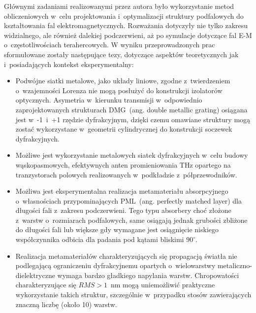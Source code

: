 Głównymi zadaniami realizowanymi przez autora było wykorzystanie metod obliczeniowych w~celu projektowania i~optymalizacji struktury podfalowych do kształtowania fal elektromagnetycznych. Rozważania dotyczyły nie tylko zakresu widzialnego, ale również dalekiej podczerwieni, aż po symulacje dotyczące fal E-M o~częstotliwościach terahercowych. W wyniku przeprowadzonych prac sformułowane zostały następujące tezy, dotyczące aspektów teoretycznych jak i~posiadających kontekst eksperymentalny:
\begin{itemize}
\item Podwójne siatki metalowe, jako układy liniowe, zgodne z~twierdzeniem o~wzajemności Lorenza nie mogą posłużyć do konstrukcji izolatorów optycznych. Asymetria w~kierunku transmisji w~odpowiednio zaprojektowanych strukturach DMG~(ang. double metallic grating) osiągana jest w~-1~i~+1 rzędzie dyfrakcyjnym, dzięki czemu omawiane struktury mogą zostać wykorzystane w~geometrii cylindrycznej do konstrukcji soczewek dyfrakcyjnych.

\item Możliwe jest wykorzystanie metalowych siatek dyfrakcyjnych w~celu budowy wąskopasmowych, efektywnych anten promieniowania THz opartego na tranzystorach polowych realizowanych w~podkładzie z~półprzewodników. 

\item Możliwa jest eksperymentalna realizacja metamateriału absorpcyjnego o~własnościach przypominających PML~(ang. perfectly matched layer) dla długości fali z~zakresu podczerwieni. Tego typu absorbery choć złożone z~warstw o~rozmiarach podfalowych, same osiągają jednak grubości zbliżone do długości fali lub większe gdy wymagane jest osiągnięcie niskiego współczynnika odbicia dla padania pod kątami bliskimi $90^{\circ}$.

\item Realizacja metamateriałów charakteryzujących się propagacją światła nie podlegającą ograniczeniu dyfrakcyjnemu opartych o~wielowarstwy metaliczno-dielektryczne wymaga bardzo gładkiego napylania warstw. Chropowatości charakteryzujące się $RMS>1$~nm mogą uniemożliwić praktyczne wykorzystanie takich struktur, szczególnie w~przypadku stosów zawierających znaczną liczbę (około 10) warstw.
\end{itemize}
